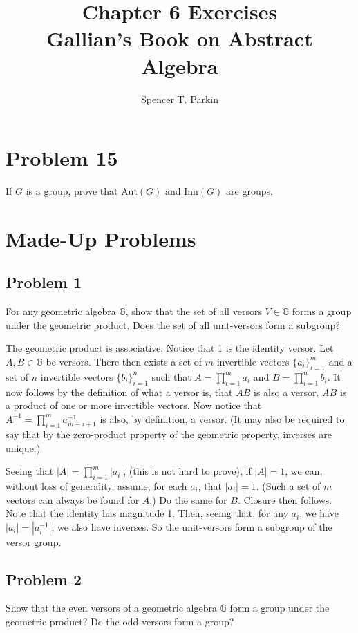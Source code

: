 \documentclass[12pt]{article}
\title{Chapter 6 Exercises\\Gallian's Book on Abstract Algebra}
\author{Spencer T. Parkin}
\newcommand{\G}{\mathbb{G}}
\newcommand{\aut}{\mbox{Aut}}
\newcommand{\inn}{\mbox{Inn}}
\begin{document}
\maketitle

\section*{Problem 15}

If $G$ is a group, prove that $\aut(G)$ and $\inn(G)$ are groups.

\section*{Made-Up Problems}

\subsection*{Problem 1}

For any geometric algebra $\G$, show that
the set of all versors $V\in\G$ forms a group under the geometric product.
Does the set of all unit-versors form a subgroup?

The geometric product is associative.
Notice that 1 is the identity versor.  Let $A,B\in\G$ be versors.
There then exists a set of $m$ invertible vectors $\{a_i\}_{i=1}^m$ and
a set of $n$ invertible vectors $\{b_i\}_{i=1}^n$ such that
$A=\prod_{i=1}^m a_i$ and $B=\prod_{i=1}^n b_i$.
It now follows by the definition of what a versor is, that $AB$ is also a versor.
$AB$ is a product of one or more invertible vectors.
Now notice that $A^{-1}=\prod_{i=1}^m a_{m-i+1}^{-1}$ is also, by
definition, a versor.  (It may also be required to say that by the zero-product
property of the geometric property, inverses are unique.)

Seeing that $|A|=\prod_{i=1}^m |a_i|$, (this is not hard to prove), if $|A|=1$, we can, without loss
of generality, assume, for each $a_i$, that $|a_i|=1$.  (Such a set of $m$
vectors can always be found for $A$.)  Do the same for $B$.  Closure then follows.  Note that the identity
has magnitude 1.  Then, seeing that, for any $a_i$, we have $|a_i|=|a_i^{-1}|$,
we also have inverses.  So the unit-versors form a subgroup of the versor group.

\subsection*{Problem 2}

Show that the even versors of a geometric algebra $\G$
form a group under the geometric product?  Do the odd versors form a group?
\end{document}
